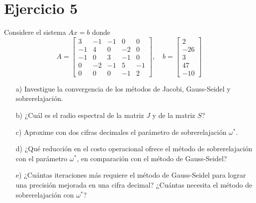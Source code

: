 
\section*{Ejercicio 5}
Considere el sistema $Ax = b$ donde
\[
A = \begin{bmatrix} 3 & -1 & -1 & 0 & 0 \\ -1 & 4 & 0 & -2 & 0 \\ -1 & 0 & 3 & -1 & 0 \\ 0 & -2 & -1 & 5 & -1 \\ 0 & 0 & 0 & -1 & 2 \end{bmatrix}, \quad b = \begin{bmatrix} 2 \\ -26 \\ 3 \\ 47 \\ -10 \end{bmatrix}
\]
\begin{enumerate}
    \item[a)] Investigue la convergencia de los métodos de Jacobi, Gauss-Seidel y sobrerelajación.
    \item[b)] ¿Cuál es el radio espectral de la matriz $J$ y de la matriz $S$?
    \item[c)] Aproxime con dos cifras decimales el parámetro de sobrerelajación $\omega^*$.
    \item[d)] ¿Qué reducción en el costo operacional ofrece el método de sobrerelajación con el parámetro $\omega^*$, en comparación con el método de Gauss-Seidel?
    \item[e)] ¿Cuántas iteraciones más requiere el método de Gauss-Seidel para lograr una precisión mejorada en una cifra decimal? ¿Cuántas necesita el método de sobrerelajación con $\omega^*$?
\end{enumerate}